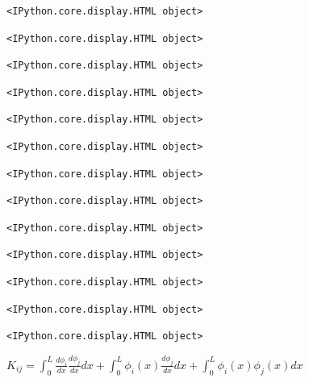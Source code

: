 \documentclass[
  11pt,
  a4paper,
]{scrbook}
\begin{document}
\begin{verbatim}
<IPython.core.display.HTML object>
\end{verbatim}

\begin{verbatim}
<IPython.core.display.HTML object>
\end{verbatim}

\begin{verbatim}
<IPython.core.display.HTML object>
\end{verbatim}

\begin{verbatim}
<IPython.core.display.HTML object>
\end{verbatim}

\begin{verbatim}
<IPython.core.display.HTML object>
\end{verbatim}

\begin{verbatim}
<IPython.core.display.HTML object>
\end{verbatim}

\begin{verbatim}
<IPython.core.display.HTML object>
\end{verbatim}

\begin{verbatim}
<IPython.core.display.HTML object>
\end{verbatim}

\begin{verbatim}
<IPython.core.display.HTML object>
\end{verbatim}

\begin{verbatim}
<IPython.core.display.HTML object>
\end{verbatim}

\begin{verbatim}
<IPython.core.display.HTML object>
\end{verbatim}

\begin{verbatim}
<IPython.core.display.HTML object>
\end{verbatim}

\begin{verbatim}
<IPython.core.display.HTML object>
\end{verbatim}

$\displaystyle K_{ij} = \int_0^L \frac{d\phi_i}{dx} \frac{d\phi_j}{dx} dx + \int_0^L \phi_i(x) \frac{d\phi_j}{dx} dx + \int_0^L \phi_i(x) \phi_j(x) dx$
\end{document}
